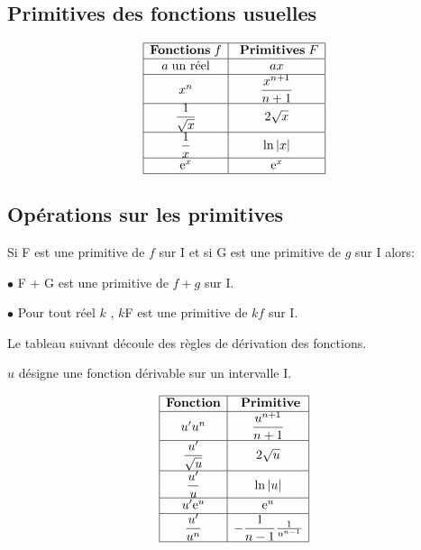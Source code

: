\medskip
\subsection*{Primitives des fonctions usuelles}

$$\begin{array}{|c|c|}
\hline
\textbf{Fonctions} \;f  &\textbf{ Primitives} \; F   \\ 
\hline
 a \; \text{un réel}  & ax \\
\hline
x^{n}    & \dfrac{x^{n+1}}{n+1} \\
\hline
 \dfrac{1}{\sqrt{x}}   &  2\sqrt{x}   \\
\hline
 \dfrac{1}{x}     &  \ln |x|     \\
\hline
\mathrm{e}^{x}     &\mathrm{e}^{x}    \\
\hline
\end{array}$$


\subsection*{Opérations sur les primitives}
\begin{property}
\noindent
Si F est une primitive de $f$ sur I et si G est une primitive de $g$ sur I alors:

\medskip
\noindent
$ \bullet $  F $+$ G est une primitive de $f + g$ sur I.

\medskip
\noindent
$ \bullet  $  Pour tout réel  $k$ ,\;  $k$F est une primitive de $kf$ sur I.
\end{property}
\medskip

Le tableau suivant découle des règles de dérivation des fonctions.

$ u $ désigne une fonction dérivable sur un intervalle I.


$$\begin{array}{|c|c|}
\hline
\textbf{Fonction}  &\textbf{ Primitive}     \\ 
\hline
 u'u^{n}   & \dfrac{u^{n+1}}{n+1}   \\
\hline
\dfrac{u'}{\sqrt{u}}    &  2\sqrt{u}    \\
\hline
\dfrac{u'}{u}  & \ln |u|      \\
\hline
u'\eexp{u}   &   \eexp{u}    \\
\hline
\dfrac{u'}{u^{n}}     &- \dfrac{1}{n-1} \frac{1}{u^{n-1}} \\
\hline

\end{array}$$



